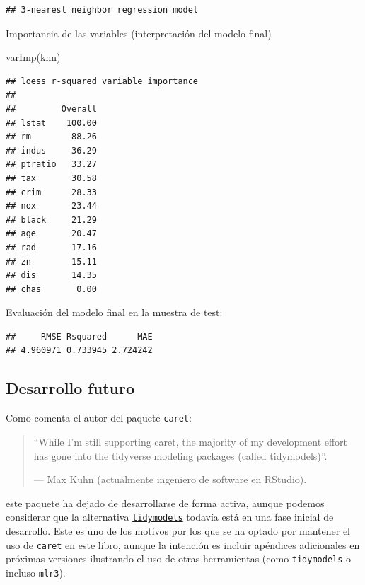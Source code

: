 \documentclass[
]{book}
\newenvironment{Shaded}{\begin{snugshade}}{\end{snugshade}}
\newcommand{\AttributeTok}[1]{\textcolor[rgb]{0.77,0.63,0.00}{#1}}
\newcommand{\FunctionTok}[1]{\textcolor[rgb]{0.00,0.00,0.00}{#1}}
\newcommand{\NormalTok}[1]{#1}
\newcommand{\SpecialCharTok}[1]{\textcolor[rgb]{0.00,0.00,0.00}{#1}}
\theoremstyle{break}
\theoremstyle{definition}
\theoremstyle{definition}
\theoremstyle{definition}
\theoremstyle{definition}
\theoremstyle{remark}
\begin{document}
\begin{verbatim}
## 3-nearest neighbor regression model
\end{verbatim}

Importancia de las variables (interpretación del modelo final)

\begin{Shaded}
\begin{Highlighting}[]
\FunctionTok{varImp}\NormalTok{(knn)}
\end{Highlighting}
\end{Shaded}

\begin{verbatim}
## loess r-squared variable importance
## 
##         Overall
## lstat    100.00
## rm        88.26
## indus     36.29
## ptratio   33.27
## tax       30.58
## crim      28.33
## nox       23.44
## black     21.29
## age       20.47
## rad       17.16
## zn        15.11
## dis       14.35
## chas       0.00
\end{verbatim}

Evaluación del modelo final en la muestra de test:

\begin{Shaded}
\end{Shaded}

\begin{verbatim}
##     RMSE Rsquared      MAE 
## 4.960971 0.733945 2.724242
\end{verbatim}

\hypertarget{desarrollo-futuro}{%
\subsection{Desarrollo futuro}\label{desarrollo-futuro}}

Como comenta el autor del paquete \texttt{caret}:

\begin{quote}
``While I'm still supporting caret, the majority of my development effort has gone into the tidyverse modeling packages (called tidymodels)''.

--- Max Kuhn (actualmente ingeniero de software en RStudio).
\end{quote}

este paquete ha dejado de desarrollarse de forma activa, aunque podemos considerar que la alternativa \href{https://www.tidymodels.org}{\texttt{tidymodels}} todavía está en una fase inicial de desarrollo.
Este es uno de los motivos por los que se ha optado por mantener el uso de \texttt{caret} en este libro, aunque la intención es incluir apéndices adicionales en próximas versiones ilustrando el uso de otras herramientas (como \texttt{tidymodels} o incluso \texttt{mlr3}).
\end{document}
